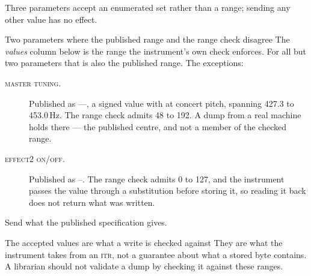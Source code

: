 Three parameters accept an enumerated set rather than a range; sending any other value has
no effect.

\begin{caution}{Two parameters where the published range and the range check disagree}
The \emph{values} column below is the range the instrument's own check enforces. For all
but two parameters that is also the published range. The exceptions:

\begin{description}
\item[ \textsc{master tuning}.] Published as ----,
  a signed value with  at concert pitch, spanning 427.3 to 453.0\,Hz. The range
  check admits 48 to 192. A dump from a real machine holds  there --- the
  published centre, and not a member of the checked range.
\item[ \textsc{effect2 on/off}.] Published as --.
  The range check admits 0 to 127, and the instrument passes the value through a
  substitution before storing it, so reading it back does not return what was written.
\end{description}

Send what the published specification gives.
\end{caution}

\begin{note}{The accepted values are what a write is checked against}
They are what the instrument takes from an \textsc{itr}, not a guarantee about what a
stored byte contains. A librarian should not validate a dump by checking it against these
ranges.
\end{note}

